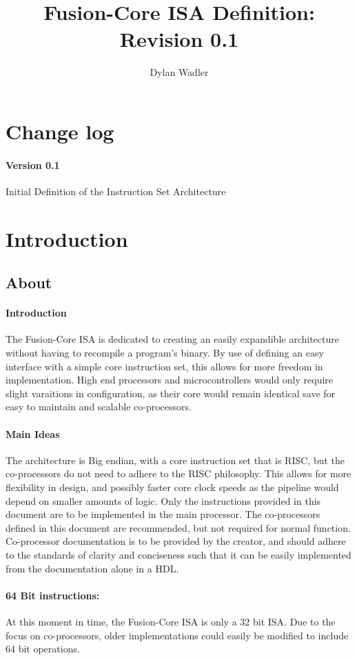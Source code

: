 \documentclass[letterpaper, 11pt]{article}
\title{Fusion-Core ISA Definition: Revision 0.1}
\author{Dylan Wadler}
\begin{document}
\maketitle
\newpage
\tableofcontents


\newpage
\section{Change log}
\paragraph{Version 0.1} Initial Definition of the Instruction Set Architecture

\section{Introduction}

\subsection{About}
\paragraph{Introduction}The Fusion-Core ISA is dedicated to creating an easily expandible architecture without having to 
recompile a program's binary. By use of defining an easy interface with a simple core instruction set, this allows for
more freedom in implementation. High end processors and microcontrollers would only require slight varaitions in
configuration, as their core would remain identical save for easy to maintain and scalable co-processors.
\paragraph{Main Ideas}The architecture is Big endian, with a core instruction set that is RISC, but the co-processors do not need to adhere to the RISC philosophy. This allows for more flexibility in design, and possibly faster core clock speeds as the pipeline would depend on smaller amounts of logic. Only the instructions provided in this document are to be implemented in the main processor. The co-processors defined in this document are recommended, but not required for normal function. Co-processor documentation is to be provided by the creator, and should adhere to the standards of clarity and conciseness such that it can be easily implemented from the documentation alone in a HDL. 
\paragraph{64 Bit instructions:}At this moment in time, the Fusion-Core ISA is only a 32 bit ISA. Due to the focus on co-processors,
older implementations could easily be modified to include 64 bit operations.
\end{document}

